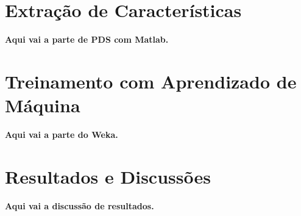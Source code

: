 \documentclass[conference]{IEEEtran}
\begin{document}

\section{Extração de Características}

\textbf{Aqui vai a parte de PDS com Matlab.}

\section{Treinamento com Aprendizado de Máquina}

\textbf{Aqui vai a parte do Weka.}

\section{Resultados e Discussões}

\textbf{Aqui vai a discussão de resultados.}
\end{document}
